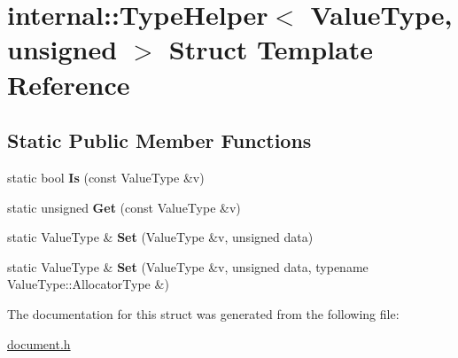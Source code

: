 \hypertarget{a02036}{}\section{internal\+:\+:Type\+Helper$<$ Value\+Type, unsigned $>$ Struct Template Reference}
\label{a02036}
\subsection*{Static Public Member Functions}
\begin{DoxyCompactItemize}
\item 
\mbox{\label{a02036_ad1c1cb931ed166508d17e866d410c99b}} 
static bool {\bfseries Is} (const Value\+Type \&v)
\item 
\mbox{\label{a02036_a2f91befe1e9e914e7431b84c0d89f572}} 
static unsigned {\bfseries Get} (const Value\+Type \&v)
\item 
\mbox{\label{a02036_a1d960542fd618ac649fe4e045c44f789}} 
static Value\+Type \& {\bfseries Set} (Value\+Type \&v, unsigned data)
\item 
\mbox{\label{a02036_a601b05a233b6025486a9105d45d46780}} 
static Value\+Type \& {\bfseries Set} (Value\+Type \&v, unsigned data, typename Value\+Type\+::\+Allocator\+Type \&)
\end{DoxyCompactItemize}


The documentation for this struct was generated from the following file\+:\begin{DoxyCompactItemize}
\item 
\hyperlink{a00476}{document.\+h}\end{DoxyCompactItemize}
